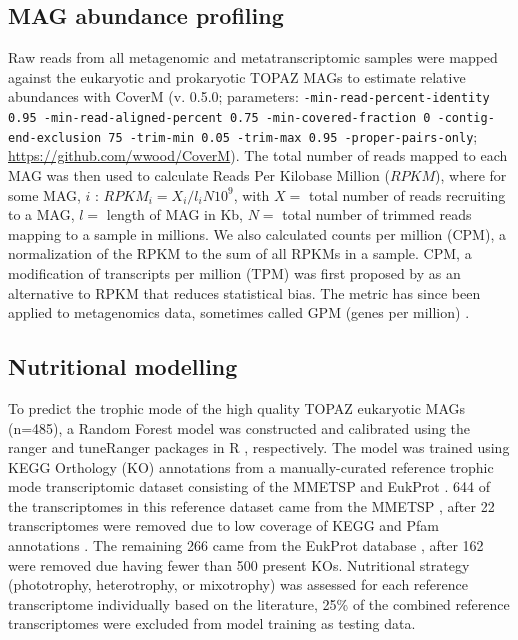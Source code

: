 \documentclass[12pt]{article}
\numberwithin{equation}{section}
\begin{document}
\subsection*{MAG abundance profiling} 

Raw reads from all metagenomic and metatranscriptomic samples were mapped against the eukaryotic and prokaryotic TOPAZ MAGs to estimate relative abundances with CoverM (v. 0.5.0; parameters: \texttt{-min-read-percent-identity 0.95 -min-read-aligned-percent 0.75  -min-covered-fraction 0 -contig-end-exclusion 75 -trim-min 0.05 -trim-max 0.95  -proper-pairs-only}; \url{https://github.com/wwood/CoverM}). The total number of reads mapped to each MAG was then used to calculate Reads Per Kilobase Million ($RPKM$), where for some MAG, $i$ :  $RPKM_i = {X_i}/{l_iN}10^9$, with $X =$ total number of reads recruiting to a MAG, $l =$ length of MAG in Kb, $N =$ total number of trimmed reads mapping to a sample in millions. We also calculated counts per million (CPM), a normalization of the RPKM to the sum of all RPKMs in a sample. CPM, a modification of transcripts per million (TPM) was first proposed by \citet{Wagner_2012} as an alternative to RPKM that reduces statistical bias. The metric has since been applied to metagenomics data, sometimes called GPM (genes per million) \citep{Gradoville_2017}. 

\subsection*{Nutritional modelling} 

To predict the trophic mode of the high quality TOPAZ eukaryotic MAGs (n=485), a Random Forest model \citep{Breiman_2001} was constructed and calibrated using the ranger \citep{Wright_2017} and tuneRanger packages in R \citep{tuneRanger}, respectively. The model was trained using KEGG Orthology (KO) annotations \citep{Kanehisa_2019} from a manually-curated reference trophic mode transcriptomic dataset consisting of the MMETSP \citep{Keeling2014} and EukProt \citep{Richter2020EukProt}. 644 of the transcriptomes in this reference dataset came from the MMETSP \citep{Keeling2014}, after 22 transcriptomes were removed due to low coverage of KEGG and Pfam annotations \citep{Finn2014Pfam}. The remaining 266 came from the EukProt database \citep{Richter2020EukProt}, after 162 were removed due having fewer than 500 present KOs. Nutritional strategy (phototrophy, heterotrophy, or mixotrophy) was assessed for each reference transcriptome individually based on the literature, 25\% of the combined reference transcriptomes were excluded from model training as testing data. 
\end{document}

